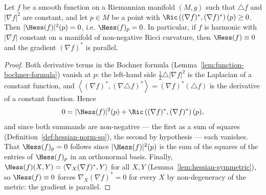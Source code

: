 \begin{corollary}
\label{cor:bochner-vanishing}
\leanok
Let $f$ be a smooth function on a Riemannian manifold $(M,g)$ such that
$\triangle f$ and $|\nabla f|^2$ are constant, and let $p\in M$ be a
point with $\Ric\left((\nabla f)^*,(\nabla f)^*\right)(p)\ge0$. Then
$|\Hess(f)|^2(p)=0$, i.e. $\Hess(f)_p=0$. In particular, if $f$ is
harmonic with $|\nabla f|$ constant on a manifold of non-negative Ricci
curvature, then $\Hess(f)\equiv0$ and the gradient $(\nabla f)^*$ is
parallel.
\end{corollary}

\begin{proof}
\leanok
Both derivative terms in the Bochner formula
(Lemma~\ref{lem:function-bochner-formula}) vanish at $p$: the
left-hand side $\frac12\triangle|\nabla f|^2$ is the Laplacian of a
constant function, and
$\left\langle(\nabla f)^*,(\nabla\triangle f)^*\right\rangle
=(\nabla f)^*(\triangle f)$ is the derivative of a constant function.
Hence
$$0=|\Hess(f)|^2(p)
+\Ric\left((\nabla f)^*,(\nabla f)^*\right)(p),$$
and since both summands are non-negative — the first as a sum of
squares (Definition~\ref{def:hessian-norm-sq}), the second by
hypothesis — each vanishes. That $\Hess(f)_p=0$ follows since
$|\Hess(f)|^2(p)$ is the sum of the squares of the entries of
$\Hess(f)_p$ in an orthonormal basis. Finally, $\Hess(f)(X,Y)
=\langle\nabla_X(\nabla f)^*,Y\rangle$ for all $X,Y$
(Lemma~\ref{lem:hessian-symmetric}), so $\Hess(f)\equiv0$ forces
$\nabla_X(\nabla f)^*=0$ for every $X$ by non-degeneracy of the
metric: the gradient is parallel.
\end{proof}

